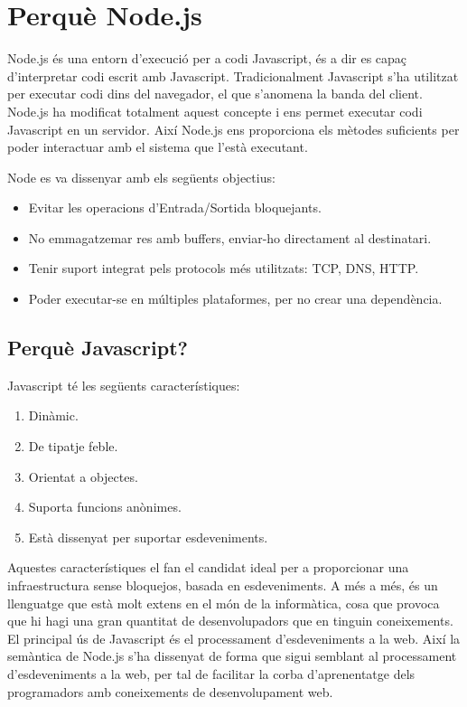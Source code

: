 \chapter{Perquè Node.js}
\label{sec:Node.js-full}

Node.js és una entorn d'execució per a codi Javascript, és a dir es capaç d'interpretar codi escrit amb Javascript. Tradicionalment Javascript s'ha utilitzat per executar codi dins del navegador, el que s'anomena la banda del client. Node.js ha modificat totalment aquest concepte i ens permet executar codi Javascript en un servidor. Així Node.js ens proporciona els mètodes suficients per poder interactuar amb el sistema que l'està executant.

Node es va dissenyar amb els següents objectius: 

\begin{itemize}
    \item{Evitar les operacions d'Entrada/Sortida bloquejants.}
    \item{No emmagatzemar res amb buffers, enviar-ho directament al destinatari.}
    \item{Tenir suport integrat pels protocols més utilitzats: TCP, DNS, HTTP.}
    \item{Poder executar-se en múltiples plataformes, per no crear una dependència.}
\end{itemize}

\section{Perquè Javascript?}

Javascript té les següents característiques: 

\begin{enumerate}
    \item{Dinàmic.}
    \item{De tipatje feble.}
    \item{Orientat a objectes.}
    \item{Suporta funcions anònimes.}
    \item{Està dissenyat per suportar esdeveniments.}
\end{enumerate}

Aquestes característiques el fan el candidat ideal per a proporcionar una infraestructura sense bloquejos, basada en esdeveniments. A més a més, és un llenguatge que està molt extens en el món de la informàtica, cosa que provoca que hi hagi una gran quantitat de desenvolupadors que en tinguin coneixements. El principal ús de Javascript és el processament d'esdeveniments a la web. Així la semàntica de Node.js s'ha dissenyat de forma que sigui semblant al processament d'esdeveniments a la web, per tal de facilitar la corba d'aprenentatge dels programadors amb coneixements de desenvolupament web.

